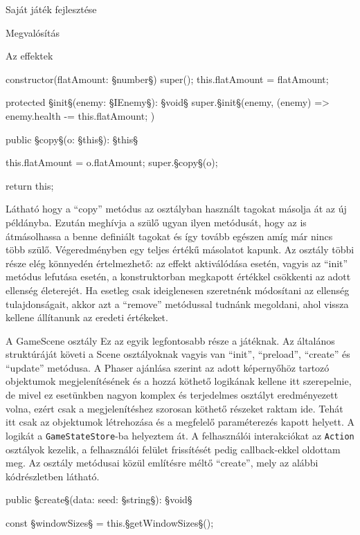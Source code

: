 \begin{MyChapter}{Saját játék fejlesztése}
\begin{MySection}{Megvalósítás}
\begin{MySubSection}{Az effektek}
\begin{javascript}
{	constructor(flatAmount: §\color{jsType}number§) {
		super();
		this.flatAmount = flatAmount;
	}
	
	protected §\color{jsMethod}init§(enemy: §\color{jsType}IEnemy§): §\color{jsType}void§ {
		super.§\color{jsMethod}init§(enemy, (enemy) => {
			enemy.health -= this.flatAmount;
		})
	}
	
	public §\color{jsMethod}copy§(o: §\color{jsType}this§): §\color{jsType}this§ {
		this.flatAmount = o.flatAmount;
		super.§\color{jsMethod}copy§(o);
		
		return this;
	}
}
			\end{javascript}
			Látható hogy a ``copy'' metódus az osztályban használt tagokat másolja át az új példányba. Ezután meghívja a szülő ugyan ilyen metódusát, hogy az is átmásolhassa a benne definiált tagokat és így tovább egészen amíg már nincs több szülő. Végeredményben egy teljes értékű másolatot kapunk.
			Az osztály többi része elég könnyedén értelmezhető: az effekt aktiválódása esetén, vagyis az ``init'' metódus lefutása esetén, a konstruktorban megkapott értékkel csökkenti az adott ellenség életerejét. Ha esetleg csak ideiglenesen szeretnénk módosítani az ellenség tulajdonságait, akkor azt a ``remove'' metódussal tudnánk megoldani, ahol vissza kellene állítanunk az eredeti értékeket.

		\end{MySubSection}
		
		\begin{MySubSection}{A GameScene osztály}
			Ez az egyik legfontosabb része a játéknak.  Az általános struktúráját követi a Scene osztályoknak vagyis van ``init'', ``preload'', ``create'' és ``update'' metódusa.
			A Phaser ajánlása szerint az adott képernyőhöz tartozó objektumok megjelenítésének és a hozzá köthető logikának kellene itt szerepelnie, de mivel ez esetünkben nagyon komplex és terjedelmes osztályt eredményezett volna, ezért csak a megjelenítéshez szorosan köthető részeket raktam ide. Tehát itt csak az objektumok létrehozása és a megfelelő paraméterezés kapott helyett. A logikát a \texttt{GameStateStore}-ba helyeztem át. A felhasználói interakciókat az \texttt{Action} osztályok kezelik, a felhasználói felület frissítését pedig callback-ekkel oldottam meg. Az osztály metódusai közül említésre méltő ``create'', mely az alábbi kódrészletben látható.	
			\begin{javascript}
public §\color{jsMethod}create§(data: {seed: §\color{jsType}string§}): §\color{jsType}void§ {
	const §\color{jsConst}windowSizes§ = this.§\color{jsMethod}getWindowSizes§();
	
}
\end{javascript}
\end{MySubSection}
\end{MySection}
\end{MyChapter}
